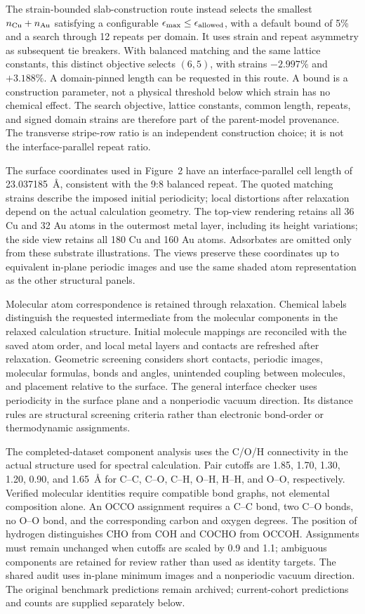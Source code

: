 \documentclass[11pt,a4paper]{article}
\begin{document}
The strain-bounded slab-construction route instead selects the smallest $n_{\rm Cu}+n_{\rm Au}$ satisfying a configurable $\epsilon_{\max}\le\epsilon_{\rm allowed}$, with a default bound of 5\% and a search through 12 repeats per domain. It uses strain and repeat asymmetry as subsequent tie breakers. With balanced matching and the same lattice constants, this distinct objective selects $(6,5)$, with strains $-2.997\%$ and $+3.188\%$. A domain-pinned length can be requested in this route. A bound is a construction parameter, not a physical threshold below which strain has no chemical effect. The search objective, lattice constants, common length, repeats, and signed domain strains are therefore part of the parent-model provenance. The transverse stripe-row ratio is an independent construction choice; it is not the interface-parallel repeat ratio.

The surface coordinates used in Figure~2 have an interface-parallel cell length of 23.037185~\AA{}, consistent with the 9:8 balanced repeat. The quoted matching strains describe the imposed initial periodicity; local distortions after relaxation depend on the actual calculation geometry. The top-view rendering retains all 36 Cu and 32 Au atoms in the outermost metal layer, including its height variations; the side view retains all 180 Cu and 160 Au atoms. Adsorbates are omitted only from these substrate illustrations. The views preserve these coordinates up to equivalent in-plane periodic images and use the same shaded atom representation as the other structural panels.

Molecular atom correspondence is retained through relaxation. Chemical labels distinguish the requested intermediate from the molecular components in the relaxed calculation structure. Initial molecule mappings are reconciled with the saved atom order, and local metal layers and contacts are refreshed after relaxation. Geometric screening considers short contacts, periodic images, molecular formulas, bonds and angles, unintended coupling between molecules, and placement relative to the surface. The general interface checker uses periodicity in the surface plane and a nonperiodic vacuum direction. Its distance rules are structural screening criteria rather than electronic bond-order or thermodynamic assignments.

The completed-dataset component analysis uses the C/O/H connectivity in the actual structure used for spectral calculation. Pair cutoffs are 1.85, 1.70, 1.30, 1.20, 0.90, and 1.65~\AA{} for C--C, C--O, C--H, O--H, H--H, and O--O, respectively. Verified molecular identities require compatible bond graphs, not elemental composition alone. An OCCO assignment requires a C--C bond, two C--O bonds, no O--O bond, and the corresponding carbon and oxygen degrees. The position of hydrogen distinguishes CHO from COH and COCHO from OCCOH. Assignments must remain unchanged when cutoffs are scaled by 0.9 and 1.1; ambiguous components are retained for review rather than used as identity targets. The shared audit uses in-plane minimum images and a nonperiodic vacuum direction. The original benchmark predictions remain archived; current-cohort predictions and counts are supplied separately below.
\end{document}
